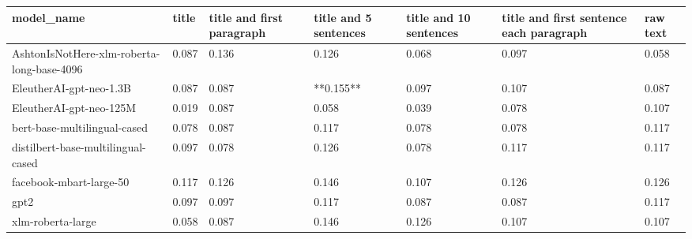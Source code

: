 \begin{tabular}{lllllll}
\toprule
                                model\_name & title & title and first paragraph & title and 5 sentences & title and 10 sentences & title and first sentence each paragraph & raw text \\
\midrule
AshtonIsNotHere-xlm-roberta-long-base-4096 & 0.087 &                     0.136 &                 0.126 &                  0.068 &                                   0.097 &    0.058 \\
                   EleutherAI-gpt-neo-1.3B & 0.087 &                     0.087 &             **0.155** &                  0.097 &                                   0.107 &    0.087 \\
                   EleutherAI-gpt-neo-125M & 0.019 &                     0.087 &                 0.058 &                  0.039 &                                   0.078 &    0.107 \\
              bert-base-multilingual-cased & 0.078 &                     0.087 &                 0.117 &                  0.078 &                                   0.078 &    0.117 \\
        distilbert-base-multilingual-cased & 0.097 &                     0.078 &                 0.126 &                  0.078 &                                   0.117 &    0.117 \\
                   facebook-mbart-large-50 & 0.117 &                     0.126 &                 0.146 &                  0.107 &                                   0.126 &    0.126 \\
                                      gpt2 & 0.097 &                     0.097 &                 0.117 &                  0.087 &                                   0.087 &    0.117 \\
                         xlm-roberta-large & 0.058 &                     0.087 &                 0.146 &                  0.126 &                                   0.107 &    0.107 \\
\bottomrule
\end{tabular}
